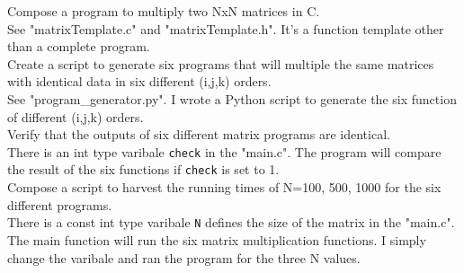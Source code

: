 \documentclass{article}
\begin{document}
Compose a program to multiply two NxN matrices in C.\\
See "matrixTemplate.c" and "matrixTemplate.h". It's a function template other than a complete program.\\

Create a script to generate six programs that will multiple the same matrices with identical data in six different (i,j,k) orders.\\
See "program\_generator.py". I wrote a Python script to generate the six function of different (i,j,k) orders.\\

Verify that the outputs of six different matrix programs are identical.\\
There is an int type varibale \texttt{check} in the "main.c". The program will compare the result of the six functions if \texttt{check} is set to 1.\\

Compose a script to harvest the running times of N=100, 500, 1000 for the six different programs.\\
There is a const int type varibale \texttt{N} defines the size of the matrix in the "main.c". The main function will run the six matrix multiplication functions. I simply change the varibale and ran the program for the three N values.\\
\end{document}
